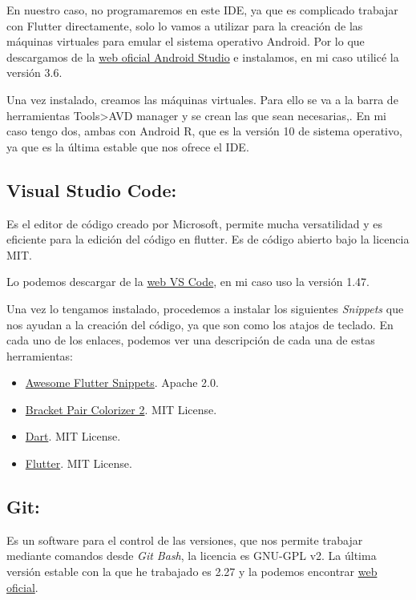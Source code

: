 En nuestro caso, no programaremos en este IDE, ya que es complicado trabajar con Flutter directamente, solo lo vamos a utilizar para la creación de las máquinas virtuales para emular el sistema operativo Android. Por lo que descargamos de la \href{https://developer.android.com/studio}{web oficial Android Studio} e instalamos, en mi caso utilicé la versión 3.6.

Una vez instalado, creamos las máquinas virtuales. Para ello se va a la barra de herramientas Tools>AVD manager y se crean las que sean necesarias,. En mi caso tengo dos, ambas con Android R, que es la versión 10 de sistema operativo, ya que es la última estable que nos ofrece el IDE.

\subsection{Visual Studio Code:}
Es el editor de código creado por Microsoft, permite mucha versatilidad y es eficiente para la edición del código en flutter. Es de código abierto bajo la licencia MIT.

Lo podemos descargar de la \href{https://code.visualstudio.com/}{web VS Code}, en mi caso uso la versión 1.47.

Una vez lo tengamos instalado, procedemos a instalar los siguientes \emph{Snippets} que nos ayudan a la creación del código, ya que son como los atajos de teclado. En cada uno de los enlaces, podemos ver una descripción de cada una de estas herramientas:

\begin{itemize}
	\tightlist
	\item \href{https://marketplace.visualstudio.com/items?itemName=Nash.awesome-flutter-snippets}{Awesome Flutter Snippets}. Apache 2.0.
	\item \href{https://marketplace.visualstudio.com/items?itemName=CoenraadS.bracket-pair-colorizer-2}{Bracket Pair Colorizer 2}. MIT License.
	\item \href{https://marketplace.visualstudio.com/items?itemName=Dart-Code.dart-code}{Dart}. MIT License.
	\item \href{https://marketplace.visualstudio.com/items?itemName=Dart-Code.flutter}{Flutter}. MIT License.
\end{itemize}

\subsection{Git:}
Es un software para el control de las versiones, que nos permite trabajar mediante comandos desde \emph{Git Bash}, la licencia es GNU-GPL v2.  La última versión estable con la que he trabajado es 2.27 y la podemos encontrar \href{https://git-scm.com/}{web oficial}.


